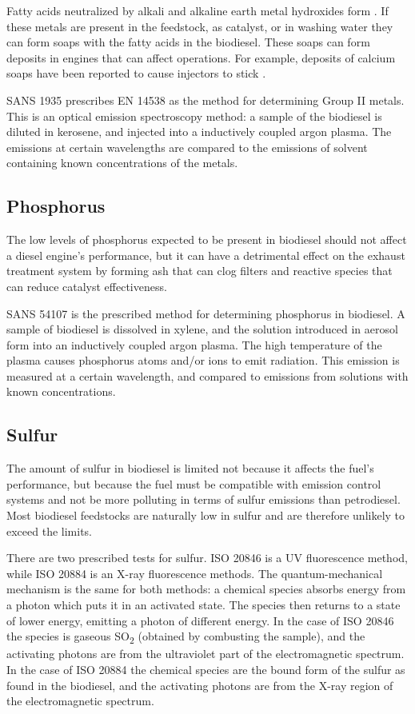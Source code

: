 Fatty acids neutralized by alkali and alkaline earth metal hydroxides form
. If these metals are present in the feedstock, as catalyst, or
in washing water they can form soaps with the fatty acids in the biodiesel.
These soaps can form deposits in engines that can affect operations. For
example, deposits of calcium soaps have been reported to cause injectors to
stick \autocite{Pischinger2000}.

SANS 1935 prescribes EN 14538 as the method for determining Group II metals.
This is an optical emission spectroscopy method: a sample of the biodiesel is
diluted in kerosene, and injected into a inductively coupled argon plasma. The
emissions at certain wavelengths are compared to the emissions of solvent
containing known concentrations of the metals.

\subsection{Phosphorus}

The low levels of phosphorus expected to be present in biodiesel should not
affect a diesel engine's performance, but it can have a detrimental effect on
the exhaust treatment system by forming ash that can clog filters and reactive
species that can reduce catalyst effectiveness.
 
SANS 54107 is the prescribed method for determining phosphorus in biodiesel. A
sample of biodiesel is dissolved in xylene, and the solution introduced in
aerosol form into an inductively coupled argon plasma. The high temperature of
the plasma causes phosphorus atoms and/or ions to emit radiation. This emission
is measured at a certain wavelength, and compared to emissions from solutions
with known concentrations.

\subsection{Sulfur}

The amount of sulfur in biodiesel is limited not because it affects the fuel's
performance, but because the fuel must be compatible with emission control
systems and not be more polluting in terms of sulfur emissions than petrodiesel.
Most biodiesel feedstocks are naturally low in sulfur and are therefore unlikely
to exceed the limits.

There are two prescribed tests for sulfur. ISO 20846 is a UV fluorescence
method, while ISO 20884 is an X-ray fluorescence methods. The quantum-mechanical
mechanism is the same for both methods: a chemical species absorbs energy from a
photon which puts it in an activated state. The species then returns to a state
of lower energy, emitting a photon of different energy.
In the case of ISO 20846 the species is gaseous SO\textsubscript{2} (obtained by
combusting the sample), and the activating photons are from the ultraviolet part
of the electromagnetic spectrum. In the case of ISO 20884 the chemical species
are the bound form of the sulfur as found in the biodiesel, and the activating
photons are from the X-ray region of the electromagnetic spectrum.

